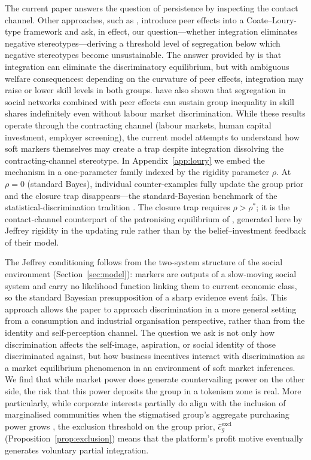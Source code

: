 \documentclass[pdflatex,sn-basic]{sn-jnl}
\theoremstyle{thmstyleone}
\numberwithin{proposition}{subsection}
\begin{document}
The current paper answers the question of persistence by inspecting
the contact channel. Other approaches, such as
\citet{ChaudhuriSethi2008}, introduce peer effects into a
Coate--Loury-type framework and ask, in effect, our
question---whether integration eliminates negative
stereotypes---deriving a threshold level of segregation below which
negative stereotypes become unsustainable. The answer provided by
\citet{ChaudhuriSethi2008} is that integration can eliminate the
discriminatory equilibrium, but with ambiguous welfare consequences:
depending on the curvature of peer effects, integration may raise or
lower skill levels in both groups. \citet{BowlesLourySethi2014} have
also shown that segregation in social networks combined with peer
effects can sustain group inequality in skill shares indefinitely even
without labour market discrimination. While these results operate
through the contracting channel (labour markets, human capital
investment, employer screening), the current model attempts to understand how soft
markers themselves may create a trap despite integration
dissolving the contracting-channel stereotype. In
Appendix~\ref{app:loury} we embed the mechanism in a one-parameter
family indexed by the rigidity parameter $\rho$. At $\rho = 0$
(standard Bayes), individual counter-examples fully update the group
prior and the closure trap disappears---the standard-Bayesian
benchmark of the statistical-discrimination tradition
\citep{Phelps1972,Arrow1973}. The closure trap requires
$\rho > \rho^*$; it is the contact-channel counterpart of the
patronising equilibrium of \citet{CoateLoury1993}, generated here by
Jeffrey rigidity in the updating rule rather than by the
belief--investment feedback of their model.

The Jeffrey conditioning follows from the
two-system structure of the social environment
(Section~\ref{sec:model}): markers are outputs of a slow-moving
social system and carry no likelihood function linking them to
current economic class, so the standard Bayesian presupposition of a
sharp evidence event fails. This approach allows the paper to approach discrimination in a more general setting from a consumption and
industrial organisation perspective, rather than from the identity
and self-perception channel. The question we ask is not only how
discrimination affects the self-image, aspiration, or social identity
of those discriminated against, but how business incentives interact with discrimination as a
market equilibrium phenomenon in an environment of soft market inferences. We find that while market power does generate countervailing power on the other side, the risk that this power deposits the group in a tokenism zone is real. More particularly, while corporate interests partially do align with the inclusion of marginalised communities when the stigmatised group's aggregate purchasing power grows \citep{Galbraith1952}, the exclusion threshold on the group prior,
$\bar{c}_g^{\text{excl}}$ (Proposition~\ref{prop:exclusion}) means that the platform's profit motive eventually generates voluntary partial integration.
\end{document}
